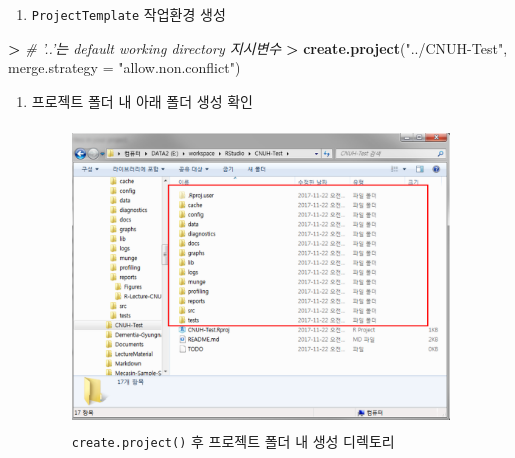 \documentclass[12pt,a4paper]{book}
\newenvironment{Shaded}{\begin{snugshade}}{\end{snugshade}}
\newcommand{\KeywordTok}[1]{\textcolor[rgb]{0.13,0.29,0.53}{\textbf{#1}}}
\newcommand{\DataTypeTok}[1]{\textcolor[rgb]{0.13,0.29,0.53}{#1}}
\newcommand{\StringTok}[1]{\textcolor[rgb]{0.31,0.60,0.02}{#1}}
\newcommand{\CommentTok}[1]{\textcolor[rgb]{0.56,0.35,0.01}{\textit{#1}}}
\newcommand{\OperatorTok}[1]{\textcolor[rgb]{0.81,0.36,0.00}{\textbf{#1}}}
\newcommand{\ErrorTok}[1]{\textcolor[rgb]{0.64,0.00,0.00}{\textbf{#1}}}
\newcommand{\NormalTok}[1]{#1}
\providecommand{\tightlist}{%
  \setlength{\itemsep}{0pt}\setlength{\parskip}{0pt}}
\theoremstyle{definition}
\theoremstyle{definition}
\theoremstyle{definition}
\theoremstyle{remark}
\begin{document}
\begin{enumerate}
\def\labelenumi{\arabic{enumi})}
\setcounter{enumi}{2}
\tightlist
\item
  \texttt{ProjectTemplate} 작업환경 생성
\end{enumerate}

\begin{Shaded}
\begin{Highlighting}[]
\OperatorTok{>}\StringTok{ }\CommentTok{# '..'는 default working directory 지시변수}
\ErrorTok{>}\StringTok{ }\KeywordTok{create.project}\NormalTok{(}\StringTok{"../CNUH-Test"}\NormalTok{, }\DataTypeTok{merge.strategy =} \StringTok{"allow.non.conflict"}\NormalTok{)}
\end{Highlighting}
\end{Shaded}

\begin{enumerate}
\def\labelenumi{\arabic{enumi})}
\setcounter{enumi}{3}
\tightlist
\item
  프로젝트 폴더 내 아래 폴더 생성 확인

  \begin{figure}[H] {
    \centering 
    \includegraphics[width = 10cm, height = 8cm]{Figures/R-projecttemplate-01.png}
    \caption[\texttt{create.project()} 후 프로젝트 폴더 내 생성 디렉토리]{\texttt{create.project()} 후 프로젝트 폴더 내 생성 디렉토리}\label{fig:RStudio-projtemp-01}
  } \end{figure}


\end{enumerate}
\end{document}
